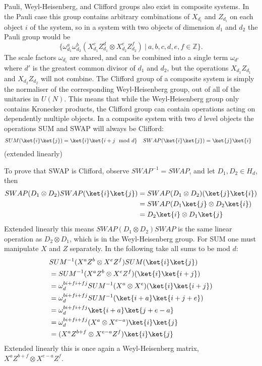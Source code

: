 Pauli, Weyl-Heisenberg, and Clifford groups also exist in composite systems. In the Pauli case this group contains arbitrary combinations of $X_{d_i}$ and $Z_{d_i}$ on each object $i$ of the system, so in a system with two objects of dimension $d_1$ and $d_2$ the Pauli group would be
\[\{\omega_{d_1}^a\omega_{d_2}^b(X_{d_1}^cZ_{d_1}^d\otimes X_{d_2}^eZ_{d_2}^f)\ |\ a, b, c, d, e, f \in \mathbb{Z}\}.\]
The scale factors $\omega_{d_i}$ are shared, and can be combined into a single term $\omega_{d'}$ where $d'$ is the greatest common divisor of $d_1$ and $d_2$, but the operations $X_{d_1}Z_{d_1}$ and $X_{d_2}Z_{d_2}$ will not combine. The Clifford group of a composite system is simply the normaliser of the corresponding Weyl-Heisenberg group, out of all of the unitaries in $U(N)$. This means that while the Weyl-Heisenberg group only contains Kronecker products, the Clifford group can contain operations acting on dependently multiple objects. In a composite system with two $d$ level objects the operations SUM and SWAP will always be Clifford:
\begin{align*}
	SUM(\ket{i}\ket{j}) = \ket{i}\ket{i+j \mod d} &&& SWAP(\ket{i}\ket{j}) = \ket{j}\ket{i}
\end{align*}
(extended linearly)

To prove that SWAP is Clifford, observe $SWAP^{-1} = SWAP$, and let $D_1, D_2 \in H_d$, then
\begin{align*}
SWAP (D_1 \otimes D_2) SWAP (\ket{i}\ket{j})
&= SWAP (D_1 \otimes D_2)(\ket{j}\ket{i})
\\&=SWAP (D_1\ket{j} \otimes D_2\ket{i})
\\&=D_2\ket{i} \otimes D_1\ket{j}
\end{align*}
Extended linearly this means $SWAP (D_1 \otimes D_2) SWAP$ is the same linear operation as $D_2 \otimes D_1$, which is in the Weyl-Heisenberg group. For SUM one must manipulate $X$ and $Z$ separately. In the following take all sums to be mod $d$:
\begin{align*}
&SUM^{-1} (X^aZ^b \otimes X^eZ^f) SUM (\ket{i}\ket{j})
\\&=SUM^{-1} (X^aZ^b \otimes X^eZ^f) (\ket{i}\ket{i+j})
\\&=\omega_d^{bi+fi+fj}SUM^{-1}(X^a \otimes X^e) (\ket{i}\ket{i+j})
\\&=\omega_d^{bi+fi+fj}SUM^{-1} (\ket{i+a}\ket{i+j+e})
\\&=\omega_d^{bi+fi+fj}\ket{i+a}\ket{j+e-a}
\\&=\omega_d^{bi+fi+fj}(X^a \otimes X^{e-a})\ket{i}\ket{j}
\\&=(X^aZ^{b+f} \otimes X^{e-a}Z^f)\ket{i}\ket{j}
\end{align*}
Extended linearly this is once again a Weyl-Heisenberg matrix, $X^aZ^{b+f} \otimes X^{e-a}Z^f$.

